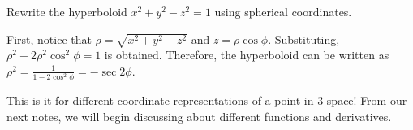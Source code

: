 \documentclass[../../main.tex]{subfiles}
\begin{document}
\begin{problem}{}{}
Rewrite the hyperboloid $x^2 + y^2 - z^2 = 1$ using spherical
coordinates.
\end{problem}
\begin{solution}
First, notice that $\rho = \sqrt{x^2 + y^2 + z^2}$ and
$z = \rho\cos\phi$. Substituting, $\rho^2 - 2\rho^2\cos^2\phi = 1$
is obtained. Therefore, the hyperboloid can be written as
$\rho^2 = \frac{1}{1 - 2\cos^2\phi} = -\sec{2\phi}$.
\end{solution}

This is it for different coordinate representations of a point in
3-space! From our next notes, we will begin discussing about different
functions and derivatives.
\end{document}
